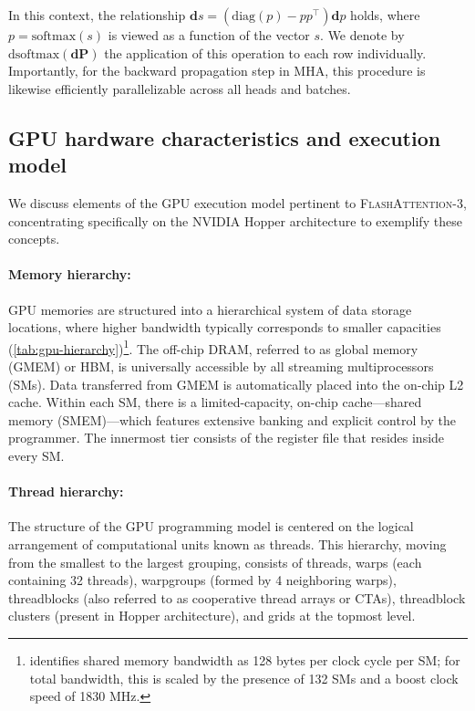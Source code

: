In this context, the relationship $\mathbf{d}s = (\mathrm{diag}(p) - p p^\top)\mathbf{d}p$ holds, where $p = \mathrm{softmax}(s)$ is viewed as a function of the vector $s$. We denote by $\mathrm{dsoftmax}(\mathbf{dP})$ the application of this operation to each row individually. Importantly, for the backward propagation step in MHA, this procedure is likewise efficiently parallelizable across all heads and batches.

\subsection{GPU hardware characteristics and execution model}
\label{subsec:hardware}

We discuss elements of the GPU execution model pertinent to \textsc{FlashAttention-3}, concentrating specifically on the NVIDIA Hopper architecture to exemplify these concepts.

\paragraph{Memory hierarchy:} GPU memories are structured into a hierarchical system of data storage locations, where higher bandwidth typically corresponds to smaller capacities (\cref{tab:gpu-hierarchy})\footnote{\citet{luo2024benchmarking} identifies shared memory bandwidth as 128 bytes per clock cycle per SM; for total bandwidth, this is scaled by the presence of 132 SMs and a boost clock speed of 1830 MHz.}. The off-chip DRAM, referred to as global memory (GMEM) or HBM, is universally accessible by all streaming multiprocessors (SMs). Data transferred from GMEM is automatically placed into the on-chip L2 cache. Within each SM, there is a limited-capacity, on-chip cache—shared memory (SMEM)—which features extensive banking and explicit control by the programmer. The innermost tier consists of the register file that resides inside every SM.

\paragraph{Thread hierarchy:} The structure of the GPU programming model is centered on the logical arrangement of computational units known as threads. This hierarchy, moving from the smallest to the largest grouping, consists of threads, warps (each containing 32 threads), warpgroups (formed by 4 neighboring warps), threadblocks (also referred to as cooperative thread arrays or CTAs), threadblock clusters (present in Hopper architecture), and grids at the topmost level.

